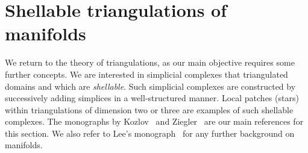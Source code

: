 \documentclass[10pt,a4paper]{article}
\begin{document}
\section{Shellable triangulations of manifolds}\label{section:advancedtriangulations}

We return to the theory of triangulations, as our main objective requires some further concepts.
We are interested in simplicial complexes that triangulated domains and which are \emph{shellable}.
Such simplicial complexes are constructed by successively adding simplices in a well-structured manner. 
Local patches (stars) within triangulations of dimension two or three are examples of such shellable complexes. 
The monographs by Kozlov~\cite{kozlov2008combinatorial} and Ziegler~\cite{ziegler1995lectures} are our main references for this section. 
We also refer to Lee's monograph~\cite{lee2011topological} for any further background on manifolds. 
\end{document}
